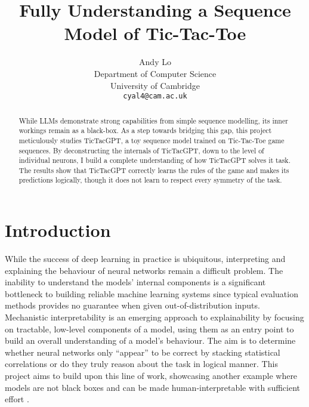 \documentclass{article}
\title{Fully Understanding a Sequence Model of Tic-Tac-Toe}
\author{%
  Andy Lo \\
  Department of Computer Science\\
  University of Cambridge\\
  \texttt{cyal4@cam.ac.uk} \\
}
\newcommand{\ttgpt}{TicTacGPT\xspace}
\newcommand{\ttt}{Tic-Tac-Toe\xspace}
\begin{document}
\begin{acronym}
\end{acronym}


\maketitle


\begin{abstract}
    While \ac{LLMs} demonstrate strong capabilities from simple sequence modelling, its inner workings remain as a black-box. As a step towards bridging this gap, this project meticulously studies \ttgpt, a toy sequence model trained on \ttt game sequences. By deconstructing the internals of \ttgpt, down to the level of individual neurons, I build a complete understanding of how \ttgpt solves it task. The results show that \ttgpt correctly learns the rules of the game and makes its predictions logically, though it does not learn to respect every symmetry of the task.
\end{abstract}


\section{Introduction}

While the success of deep learning in practice is ubiquitous, interpreting and explaining the behaviour of neural networks remain a difficult problem. The inability to understand the models' internal components is a significant bottleneck to building reliable machine learning systems since typical evaluation methods provides no guarantee when given out-of-distribution inputs. Mechanistic interpretability is an emerging approach to explainability by focusing on tractable, low-level components of a model, using them as an entry point to build an overall understanding of a model's behaviour. The aim is to determine whether neural networks only ``appear'' to be correct by stacking statistical correlations or do they truly reason about the task in logical manner. This project aims to build upon this line of work, showcasing another example where models are not black boxes and can be made human-interpretable with sufficient effort \cite{nanda2023progress,tigges2023linear,heimersheim2023circuit}.
\end{document}
